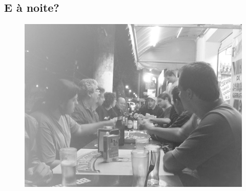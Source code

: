 \subsection{E à noite?}
\begin{figure}[b!]
    \centering
    \includegraphics[scale=0.72,keepaspectratio=true]{img/imgs/6-comida/-052.jpg}
\end{figure}

